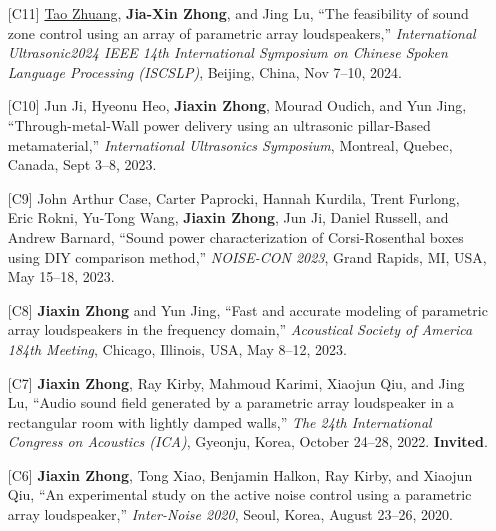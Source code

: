 \documentclass[10pt,a4paper,ragged2e,withhyper]{altacv}
\newcommand{\PubConference}[1]{\textit{#1}}
\newcommand{\PubTitle}[1]{``{#1,}''}
\newcommand{\PubMe}[1]{\textbf{#1}}
\begin{document}
\begin{itemize}[leftmargin = 30pt]
    \item [{[C11]}]
          \underline{Tao Zhuang}, \PubMe{Jia-Xin Zhong}, and Jing Lu,
          \PubTitle{The feasibility of sound zone control using an array of parametric array loudspeakers}
          \PubConference{International Ultrasonic2024 IEEE 14th International Symposium on Chinese Spoken Language Processing (ISCSLP)},
          Beijing, China, Nov 7--10, 2024.
    \item [{[C10]}]
          Jun Ji, Hyeonu Heo, \PubMe{Jiaxin Zhong}, Mourad Oudich, and Yun Jing,
          \PubTitle{Through-metal-Wall power delivery using an ultrasonic pillar-Based metamaterial}
          \PubConference{International Ultrasonics Symposium},
          Montreal, Quebec, Canada, Sept 3--8, 2023.
    \item [{[C9]}]
          John Arthur Case, Carter Paprocki, Hannah Kurdila, Trent Furlong, Eric Rokni, Yu-Tong Wang, \PubMe{Jiaxin Zhong}, Jun Ji, Daniel Russell, and Andrew Barnard,
          \PubTitle{Sound power characterization of Corsi-Rosenthal boxes using DIY comparison method}
          \PubConference{NOISE-CON 2023},
          Grand Rapids, MI, USA, May 15--18, 2023.
          \href{https://github.com/JiaxinZhong/JiaxinZhong.github.io/raw/master/publications/conference/Case2023-NoiseCon2023.pdf}{\color{accent}\faFilePdf[regular]}
    \item [{[C8]}]
          \PubMe{Jiaxin Zhong} and Yun Jing,
          \PubTitle{Fast and accurate modeling of parametric array loudspeakers in the frequency domain}
          \PubConference{Acoustical Society of America 184th Meeting},
          Chicago, Illinois, USA, May 8--12, 2023.
          \href{https://github.com/JiaxinZhong/JiaxinZhong.github.io/raw/master/publications/conference/Zhong2023_ASA184Chicago.pdf}{\color{accent}\faFilePowerpoint[regular]}
          \item[{[C7]}]
          \PubMe{Jiaxin Zhong}, Ray Kirby, Mahmoud Karimi, Xiaojun Qiu, and Jing Lu,
          \PubTitle{Audio sound field generated by a parametric array loudspeaker in a rectangular room with lightly damped walls}
          \PubConference{The 24th International Congress on Acoustics (ICA)},
          Gyeonju, Korea, October 24--28, 2022.
          \textbf{Invited}.
          \href{https://github.com/JiaxinZhong/JiaxinZhong.github.io/raw/master/publications/conference/Zhong2022-ICA-PAL_room.pdf}{\color{accent}\faFilePdf[regular]}

          \item[{[C6]}] \PubMe{Jiaxin Zhong}, Tong Xiao, Benjamin Halkon, Ray Kirby, and Xiaojun Qiu,
          \PubTitle{An experimental study on the active noise control using a parametric array loudspeaker}
          \PubConference{Inter-Noise 2020},
          Seoul, Korea,
          August 23--26, 2020.
          \href{https://github.com/JiaxinZhong/JiaxinZhong.github.io/raw/master/publications/conference/Zhong2020-Internoise-PAL_ANC.pdf}{\color{accent}\faFilePdf[regular]}


\end{itemize}
\end{document}
